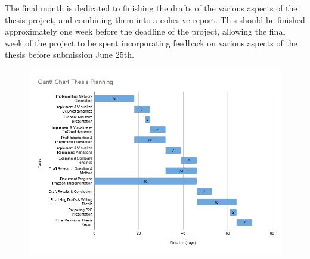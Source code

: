 \documentclass{article}
\begin{document}
The final month is dedicated to finishing the drafts of the various aspects of the thesis project, and combining them into a cohesive report. This should be finished approximately one week before the deadline of the project, allowing the final week of the project to be spent incorporating feedback on various aspects of the thesis before submission June 25th.
\begin{center}
    \begin{figure}[!htbp]
        \centering
        \hspace*{-3cm}
        \includegraphics[width=1.2\textwidth]{Gantt2.png}
    \end{figure}
\end{center}



\end{document}

